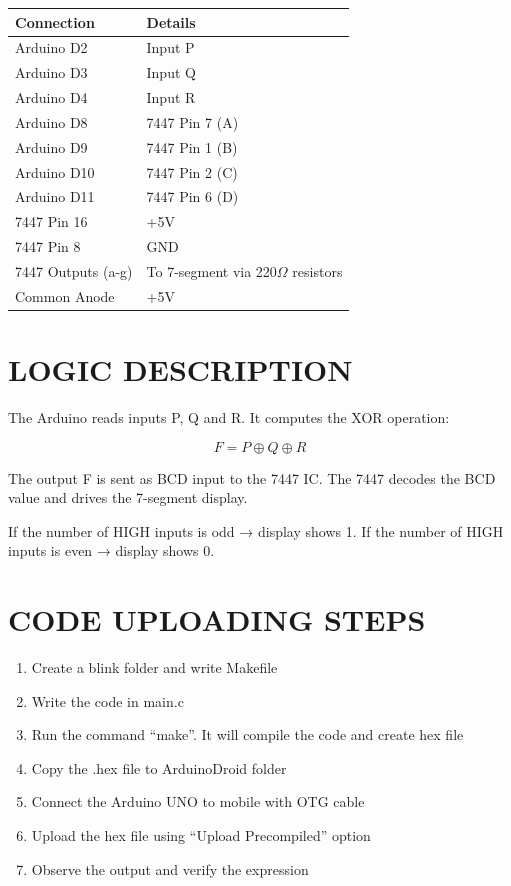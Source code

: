 \documentclass[12pt,a4paper]{article}
\begin{document}
\begin{center}
\begin{tabular}{|l|l|}
\hline
Connection & Details \\
\hline
Arduino D2 & Input P \\
Arduino D3 & Input Q \\
Arduino D4 & Input R \\
Arduino D8 & 7447 Pin 7 (A) \\
Arduino D9 & 7447 Pin 1 (B) \\
Arduino D10 & 7447 Pin 2 (C) \\
Arduino D11 & 7447 Pin 6 (D) \\
7447 Pin 16 & +5V \\
7447 Pin 8 & GND \\
7447 Outputs (a-g) & To 7-segment via 220$\Omega$ resistors \\
Common Anode & +5V \\
\hline
\end{tabular}
\end{center}

\section*{LOGIC DESCRIPTION}

The Arduino reads inputs P, Q and R.  
It computes the XOR operation:

\[
F = P \oplus Q \oplus R
\]

The output F is sent as BCD input to the 7447 IC.  
The 7447 decodes the BCD value and drives the 7-segment display.  

If the number of HIGH inputs is odd → display shows 1.  
If the number of HIGH inputs is even → display shows 0.

\section*{CODE UPLOADING STEPS}

\begin{enumerate}
\item Create a blink folder and write Makefile
\item Write the code in main.c
\item Run the command ``make''. It will compile the code and create hex file
\item Copy the .hex file to ArduinoDroid folder
\item Connect the Arduino UNO to mobile with OTG cable
\item Upload the hex file using ``Upload Precompiled'' option
\item Observe the output and verify the expression
\end{enumerate}
\end{document}
